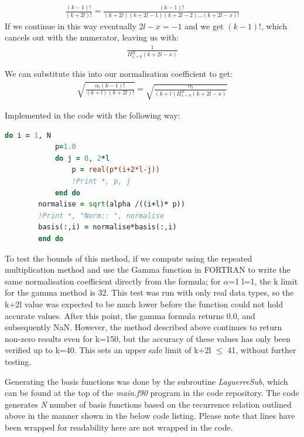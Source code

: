 \documentclass{article}
\begin{document}
    \begin{gather}
    	\frac{(k-1)!}{(k+2l)!} = \frac{(k-1)!}{(k+2l)(k+2l-1)(k+2l-2)...(k+2l-x)!}
    \end{gather}
    If we continue in this way eventually $2l-x=-1$ and we get $(k-1)!$, which cancels out with the numerator, leaving us with:
    \begin{gather}
    	\frac{1}{\Pi_{x=0}^{2l}(k+2l-x)}
    \end{gather}
    
    We can substitute this into our normalisation coefficient to get:
    \begin{gather}
    	\sqrt{\frac{\alpha_l (k-1)!}{(k+l)(k+2l)!}} = \sqrt{\frac{\alpha_l}{(k+l)\Pi_{x=0}^{2l}(k+2l-x)}}
    \end{gather}
    
    Implemented in the code with the following way:
    \begin{lstlisting}[language=Fortran]
    	do i = 1, N
    		p=1.0
	    	do j = 0, 2*l
	    		p = real(p*(i+2*l-j))
	    		!Print *, p, j
	    	end do
    	normalise = sqrt(alpha /((i+l)* p))
    	!Print *, "Norm:: ", normalise
    	basis(:,i) = normalise*basis(:,i)
    	end do
    \end{lstlisting}
    
    To test the bounds of this method, if we compute using the repeated multiplication method and use the Gamma function in FORTRAN to write the same normalisation coefficient directly from the formula; for $\alpha$=1 l=1, the k limit for the gamma method is 32. This test was run with only real data types, so the k+2l value was expected to be much lower before the function could not hold accurate values. After this point, the gamma formula returns 0.0, and subsequently NaN. However, the method described above continues to return non-zero results even for k=150, but the accuracy of these values has only been verified up to k=40. This sets an upper safe limit of k+2l $\leq$ 41, without further testing.
    
    
    Generating the basis functions was done by the subroutine \textit{LaguerreSub}, which can be found at the top of the \textit{main.f90} program in the code repository. The code generates \textit{N} number of basis functions based on the recurrence relation outlined above in the manner shown in the below code listing. Please note that lines have been wrapped for readability here are not wrapped in the code.
    
\end{document}
